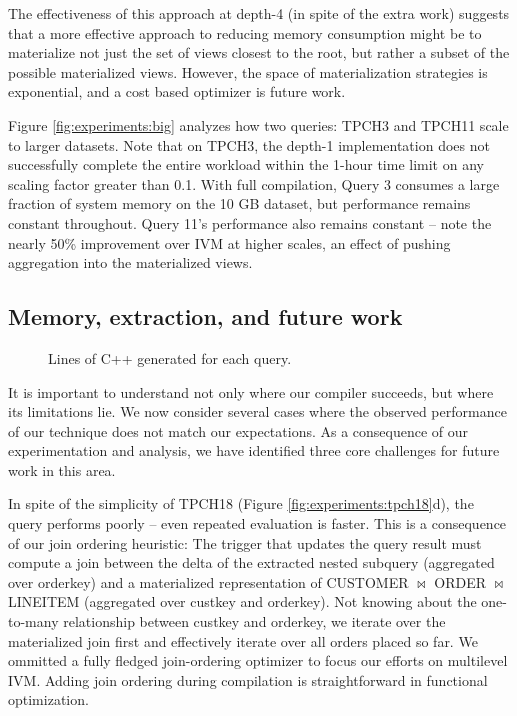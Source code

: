 The effectiveness of this approach at depth-4 (in spite of the extra work) suggests that a more effective approach to reducing memory consumption might be to materialize not just the set of views closest to the root, but rather a subset of the possible materialized views.  However, the space of materialization strategies is exponential, and a cost based optimizer is future work.

Figure \ref{fig:experiments:big} analyzes how two queries: TPCH3 and TPCH11 scale to larger datasets.  Note that on TPCH3, the depth-1 implementation does not successfully complete the entire workload within the 1-hour time limit on any scaling factor greater than 0.1.  With full compilation, Query 3 consumes a large fraction of system memory on the 10 GB dataset, but performance remains constant throughout.  Query 11's performance also remains constant -- note the nearly 50\% improvement over IVM at higher scales, an effect of pushing aggregation into the materialized views.

\subsection{Memory, extraction, and future work}
\label{sec:experiments:future}

\begin{figure}
\begin{center}

\caption{Lines of C++ generated for each query.}
\label{fig:experiments:loc}
\end{center}
\vspace*{-0.35in}
\end{figure}

It is important to understand not only where our compiler succeeds, but where its limitations lie.  We now consider several cases where the observed performance of our technique does not match our expectations.  As a consequence of our experimentation and analysis, we have identified three core challenges for future work in this area.

In spite of the simplicity of TPCH18 (Figure \ref{fig:experiments:tpch18}d), the query performs poorly -- even repeated evaluation is faster.  This is a consequence of our join ordering heuristic: The trigger that updates the query result must compute a join between the delta of the extracted nested subquery (aggregated over orderkey) and a materialized representation of CUSTOMER $\bowtie$ ORDER $\bowtie$ LINEITEM (aggregated over custkey and orderkey).  
Not knowing about the one-to-many relationship between custkey and orderkey, we iterate over the materialized join first and effectively iterate over all orders placed so far.
We ommitted a fully fledged join-ordering optimizer to focus our efforts on multilevel IVM. Adding join ordering during compilation is straightforward in functional optimization.

